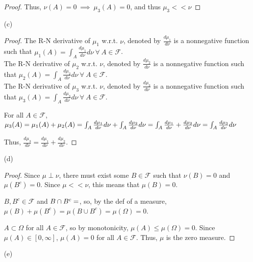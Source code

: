 \documentclass[12pt,letterpaper, onecolumn]{exam}
\newcommand{\calF}{\mathcal{F}}
\begin{document}
\begin{questions}
\begin{proof}
        Thus, $\nu(A) = 0 \: \implies \: \mu_3(A) = 0$, and thus $\mu_3 << \nu$
        \end{proof}

    (c) \begin{proof}
        The R-N derivative of $\mu_1$ w.r.t. $\nu$, denoted by $\frac{d \mu_1}{d\nu}$ is a nonnegative function such that $\mu_1(A) = \int_A \frac{d \mu_1}{d\nu} d\nu \: \forall \: A \in \calF$. \\
        The R-N derivative of $\mu_2$ w.r.t. $\nu$, denoted by $\frac{d \mu_2}{d\nu}$ is a nonnegative function such that $\mu_2(A) = \int_A \frac{d \mu_2}{d\nu} d\nu \: \forall \: A \in \calF$. \\
        The R-N derivative of $\mu_3$ w.r.t. $\nu$, denoted by $\frac{d \mu_3}{d\nu}$ is a nonnegative function such that $\mu_3(A) = \int_A \frac{d \mu_3}{d\nu} d\nu \: \forall \: A \in \calF$.

        For all $A \in \calF$, $\mu_3(A) = \mu_1(A) + \mu_2(A) = \int_A \frac{d \mu_1}{d\nu} d\nu + \int_A \frac{d \mu_2}{d\nu} d\nu \\ = \int_A \frac{d \mu_1}{d\nu} + \frac{d \mu_2}{d\nu} d\nu  = \int_A \frac{d \mu_3}{d\nu} d\nu$

        Thus, $\frac{d \mu_3}{d\nu} = \frac{d \mu_1}{d\nu} + \frac{d \mu_2}{d\nu}$.
        \end{proof}

        (d) \begin{proof}
            Since $\mu \perp \nu$, there must exist some $B \in \calF$ such that $\nu(B) = 0$ and $\mu(B^c) = 0$. Since $\mu << \nu$, this means that $\mu(B) = 0$.

            $B, B^c \in \calF$ and $B \cap B^c = \empty$, so, by the def of a measure, $\mu(B) + \mu(B^c) = \mu(B \cup B^c) = \mu(\Omega) = 0$.

            $A \subset \Omega$ for all $A \in \calF$, so by monotonicity, $\mu(A) \leq \mu(\Omega) = 0$. Since $\mu(A) \in [0, \infty]$, $\mu(A) = 0$ for all $A \in \calF$. Thus, $\mu$ is the zero measure. 
        \end{proof}

\newpage

        (e)
        \begingroup


\end{questions}
\end{document}
